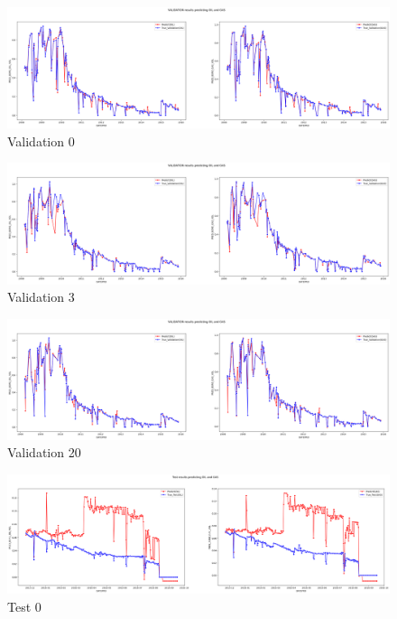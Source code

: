 \begin{figure}[h!]
    \centering
    \includegraphics[width=1.0\textwidth]{images/Validation_lag_0.png}
    \caption{Validation 0}
    \label{fig:Val_0}
\end{figure}

\begin{figure}[h!]
    \centering
    \includegraphics[width=1.0\textwidth]{images/Validation_lag_3.png}
    \caption{Validation 3}
    \label{fig:Val_3}
\end{figure}

\begin{figure}[h!]
    \centering
    \includegraphics[width=1.0\textwidth]{images/Validation_lag_20.png}
    \caption{Validation 20}
    \label{fig:Val_20}
\end{figure}


\begin{figure}[h!]
    \centering
    \includegraphics[width=1.0\textwidth]{images/Teste_lag_0.png}
    \caption{Test 0}
    \label{fig:Test_0}
\end{figure}

